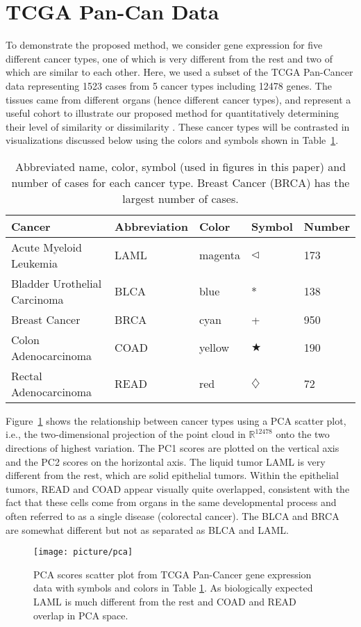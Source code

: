 \documentclass[12pt]{article}
\begin{document}
\section{TCGA Pan-Can Data}
\label{subsec:Cancer-Data-Illustration}

To demonstrate the proposed method, we consider gene expression for five different cancer types, one of which is very different from the rest and two of which are similar to each other. Here, we used a subset of the TCGA Pan-Cancer data representing 1523 cases from 5 cancer types including 12478 genes. The tissues came from different organs (hence different cancer types), and represent a useful cohort to illustrate our proposed method for quantitatively determining their level of similarity or dissimilarity \citep{hoadley2018cell, hutter2018cancer}. These cancer types will be contrasted in visualizations discussed below using the colors and symbols shown in Table~\ref{t1}.
\begin{table}%
\begin{tabular}{lllll}
Cancer & Abbreviation & Color & Symbol & Number \\
\hline
Acute Myeloid Leukemia & LAML & magenta & $\triangleleft$ & 173 \\
Bladder Urothelial Carcinoma  & BLCA & blue & *  & 138 \\
Breast Cancer  & BRCA & cyan & + &  950\\
Colon Adenocarcinoma  & COAD & yellow & $\bigstar$ & 190 \\
Rectal Adenocarcinoma& READ &red  & $\diamondsuit$ & 72
\end{tabular}
\caption{Abbreviated name, color, symbol (used in figures in this paper) and number of cases for each cancer type. Breast Cancer (BRCA) has the largest number of cases.
\label{t1}}
\end{table}

Figure~\ref{pca} shows the relationship between cancer types using a PCA scatter plot, i.e., the two-dimensional projection of the point cloud in $\mathbb{R}^{12478}$ onto the two directions of highest variation. The PC1 scores are plotted on the vertical axis and the PC2 scores on the horizontal axis. The liquid tumor LAML is very different from the rest, which are solid epithelial tumors. Within the epithelial tumors, READ and COAD appear visually quite overlapped, consistent with the fact that these cells come from organs in the same developmental process and often referred to as a single disease (colorectal cancer). The BLCA and BRCA are somewhat different but not as separated as BLCA and LAML. 
\begin{figure}%
  \centering
  \texttt{[image: picture/pca]}\\
  \caption{PCA scores scatter plot from TCGA Pan-Cancer gene expression data with symbols and colors in Table \ref{t1}. As biologically expected LAML is much different from the rest and COAD and READ overlap in PCA space.}
  \label{pca}
\end{figure}
\end{document}
